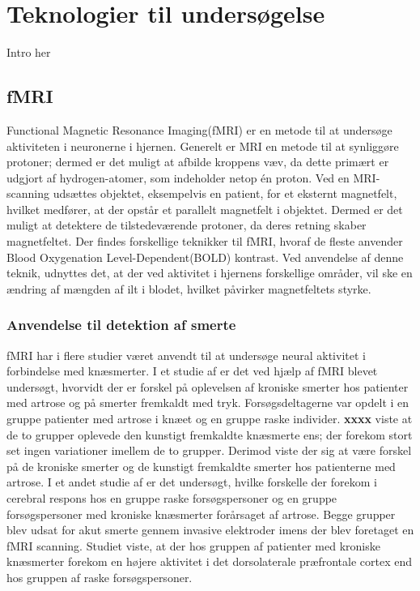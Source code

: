 \section{Teknologier til undersøgelse} %
Intro her

\subsection{fMRI}
Functional Magnetic Resonance Imaging(fMRI) er en metode til at undersøge aktiviteten i neuronerne i hjernen.
Generelt er MRI en metode til at synliggøre protoner; dermed er det muligt at afbilde kroppens væv, da dette primært er udgjort af hydrogen-atomer, som indeholder netop én proton.     
Ved en MRI-scanning udsættes objektet, eksempelvis en patient, for et eksternt magnetfelt, hvilket medfører, at der opstår et parallelt magnetfelt i objektet. Dermed er det muligt at detektere de tilstedeværende protoner, da deres retning skaber magnetfeltet.\citep{1}
Der findes forskellige teknikker til fMRI, hvoraf de fleste anvender Blood Oxygenation Level-Dependent(BOLD) kontrast. Ved anvendelse af denne teknik, udnyttes det, at der ved aktivitet i hjernens forskellige områder, vil ske en ændring af mængden af ilt i blodet, hvilket påvirker magnetfeltets styrke. \citep{1}

\subsubsection{Anvendelse til detektion af smerte}
fMRI har i flere studier været anvendt til at undersøge neural aktivitet i forbindelse med knæsmerter.
I et studie af \citep{3} er det ved hjælp af fMRI blevet undersøgt, hvorvidt der er forskel på oplevelsen af kroniske smerter hos patienter med artrose og på smerter fremkaldt med tryk. Forsøgsdeltagerne var opdelt i en gruppe patienter med artrose i knæet og en gruppe raske individer. \textbf{xxxx} viste at de to grupper oplevede den kunstigt fremkaldte knæsmerte ens; der forekom stort set ingen variationer imellem de to grupper. Derimod viste der sig at være forskel på de kroniske smerter og de kunstigt fremkaldte smerter hos patienterne med artrose. \citep{3} 
I et andet studie af \citep{2} er det undersøgt, hvilke forskelle der forekom i cerebral respons hos en gruppe raske forsøgspersoner og en gruppe forsøgspersoner med kroniske knæsmerter forårsaget af artrose. Begge grupper blev udsat for akut smerte gennem invasive elektroder imens der blev foretaget en fMRI scanning. Studiet viste, at der hos gruppen af patienter med kroniske knæsmerter forekom en højere aktivitet i det dorsolaterale præfrontale cortex end hos gruppen af raske forsøgspersoner. \citep{2} 

